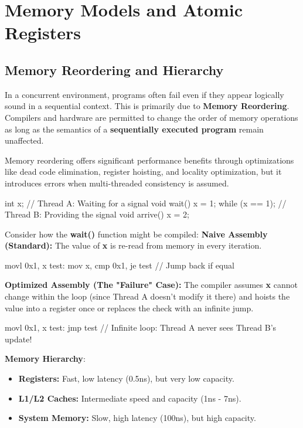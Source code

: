 \section{Memory Models and Atomic Registers}

\subsection{Memory Reordering and Hierarchy}

\begin{remark}
    In a concurrent environment, programs often fail even if they appear logically sound in a sequential context. This is primarily due to \textbf{Memory Reordering}. Compilers and hardware are permitted to change the order of memory operations as long as the semantics of a \textbf{sequentially executed program} remain unaffected.
\end{remark}

Memory reordering offers significant performance benefits through optimizations like dead code elimination, register hoisting, and locality optimization, but it introduces errors when multi-threaded consistency is assumed.

\begin{codeexample}
int x;
// Thread A: Waiting for a signal
void wait() { 
    x = 1; 
    while (x == 1); 
}
// Thread B: Providing the signal
void arrive() { 
    x = 2; 
}
\end{codeexample}

Consider how the \textbf{wait()} function might be compiled:
\textbf{Naive Assembly (Standard):} The value of \textbf{x} is re-read from memory in every iteration.

\begin{codeexample}
movl 0x1, x  
test:
mov x, %
cmp 0x1, %
je test        // Jump back if equal
\end{codeexample}

\textbf{Optimized Assembly (The "Failure" Case):} The compiler assumes \textbf{x} cannot change within the loop (since Thread A doesn't modify it there) and hoists the value into a register once or replaces the check with an infinite jump.

\begin{codeexample}
movl 0x1, x
test:
jmp test       // Infinite loop: Thread A never sees Thread B's update!
\end{codeexample}

\begin{definition} 
    \textbf{Memory Hierarchy}:
    \begin{itemize} 
        \item \textbf{Registers:} Fast, low latency (0.5ns), but very low capacity.
        \item \textbf{L1/L2 Caches:} Intermediate speed and capacity (1ns - 7ns). 
        \item \textbf{System Memory:} Slow, high latency (100ns), but high capacity.
    \end{itemize}
\end{definition}

